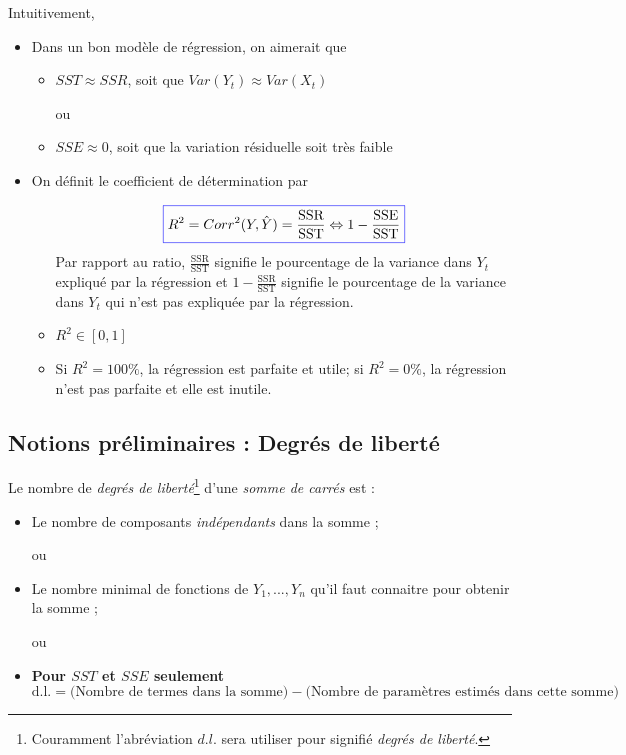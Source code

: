 \documentclass[11pt,french]{report}
\begin{document}
Intuitivement, 
\begin{itemize}
     \item Dans un bon modèle de régression, on aimerait que 
          \begin{itemize}
          \item $SST \approx SSR$, soit que $Var(Y_t) \approx Var(X_t)$ 
          \item[ou]
          \item $SSE \approx 0$, soit que la variation résiduelle soit très faible
          \end{itemize}
     \item On définit le coefficient de détermination par
          \begin{itemize}
          
          \item[]\begin{equation}
          \label{eq:R}
          \color{blue}
          \boxed{\color{black}
          R^2 = Corr^2(Y, \hat{Y}) = \frac{\text{SSR}}{\text{SST}} \Leftrightarrow 1 - \frac{\text{SSE}}{\text{SST}}}
          \end{equation}
          Par rapport au ratio, $\frac{\text{SSR}}{\text{SST}}$ signifie le pourcentage de la variance dans $Y_t$ expliqué par la régression et 
          $1 - \frac{\text{SSR}}{\text{SST}}$ signifie le pourcentage de la variance dans $Y_t$ qui n'est pas expliquée par la régression.
          \item $R^2 \in [0,1] $
          \item Si $R^2 = 100 \%$, la régression est parfaite et utile; si $R^2 = 0 \%$, la régression n'est pas parfaite et elle est inutile.
          \end{itemize}
\end{itemize}

\subsection{Notions préliminaires : Degrés de liberté}
Le nombre de \emph{degrés de liberté}\footnote{Couramment l'abréviation $d.l.$ sera utiliser pour signifié \emph{degrés de liberté}.} d'une \emph{somme de carrés} est :
\begin{itemize}
     \item Le nombre de composants \emph{indépendants} dans la somme ;
     \item[ou]
     \item Le nombre minimal de fonctions de $Y_1, ..., Y_n$ qu'il faut connaitre pour obtenir la somme ;
     \item[ou]
     \item \textbf{Pour $SST$ et $SSE$ seulement}
     $$
     \text{d.l.} = \Big( \text{Nombre de termes dans la somme}\Big) - \Big( \text{Nombre de paramètres estimés dans cette somme}\Big)
     $$
\end{itemize}
\end{document}
